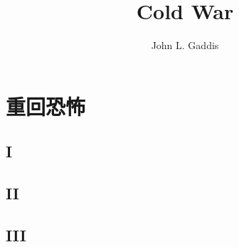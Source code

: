 \documentclass[oneside,11pt]{memoir} %
\title{Cold War} %
\author{John L. Gaddis} %
\begin{document}

\chapter{重回恐怖}


\section*{I}

\section*{II}

\section*{III}

\end{document}
